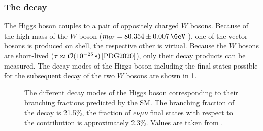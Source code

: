 \subsubsection{The \HWWdet decay}
The Higgs boson couples to a pair of oppositely charged $W$ bosons.
Because of the high mass of the $W$ boson ($m_W = 80.354 \pm 0.007\,\GeV$ \cite{PDG2020}), one of the vector bosons is produced on shell, the respective other is virtual.
Because the $W$ bosons are short-lived ($\tau \approx \mathcal{O}(10^{-25}\,\text{s})\,\text{\cite{PDG2020}}$), only their decay products can be measured. 
The decay modes of the Higgs boson including the final states possible for the subsequent decay of the two $W$ bosons are shown in \cref{fig:h-branching-ratios}. 
\begin{figure}[th]
    \caption{The different decay modes of the Higgs boson corresponding to their branching fractions predicted by the SM. The branching fraction of the \HWW decay is 21.5\%, the fraction of $e\nu\mu\nu$ final states with respect to the \HWW contribution is approximately 2.3\%. Values are taken from .}
    \label{fig:h-branching-ratios}
\end{figure}

